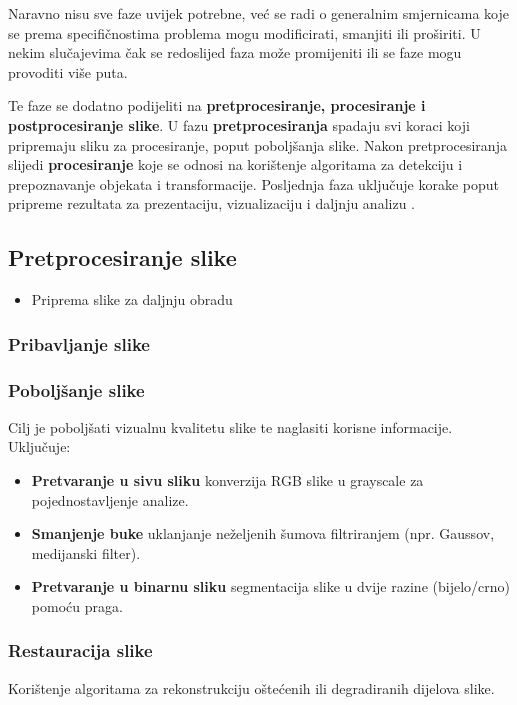 \documentclass{foi}
\begin{document}
Naravno nisu sve faze uvijek potrebne, već se radi o generalnim smjernicama koje se prema specifičnostima problema mogu modificirati, smanjiti ili proširiti. U nekim slučajevima čak se redoslijed faza može promijeniti ili se faze mogu provoditi više puta.    

Te faze se dodatno podijeliti na \textbf{pretprocesiranje, procesiranje i postprocesiranje slike}. U fazu \textbf{pretprocesiranja} spadaju svi koraci koji pripremaju sliku za procesiranje, poput poboljšanja slike. Nakon pretprocesiranja slijedi \textbf{procesiranje} koje se odnosi na korištenje algoritama za detekciju i prepoznavanje objekata i transformacije. Posljednja faza uključuje korake poput pripreme rezultata za prezentaciju, vizualizaciju i daljnju analizu \cite{IamgeProcesingPhases}.


\subsection{Pretprocesiranje slike}
\begin{itemize}
    \item Priprema slike za daljnju obradu
\end{itemize}

\subsubsection{Pribavljanje slike}

\subsubsection{Poboljšanje slike}
Cilj je poboljšati vizualnu kvalitetu slike te naglasiti korisne informacije. Uključuje:
\begin{itemize}
    \item \textbf{Pretvaranje u sivu sliku}  konverzija RGB slike u grayscale za pojednostavljenje analize.
    \item \textbf{Smanjenje buke}  uklanjanje neželjenih šumova filtriranjem (npr. Gaussov, medijanski filter).
    \item \textbf{Pretvaranje u binarnu sliku}  segmentacija slike u dvije razine (bijelo/crno) pomoću praga.
\end{itemize}

\subsubsection{Restauracija slike}
Korištenje algoritama za rekonstrukciju oštećenih ili degradiranih dijelova slike.
\end{document}
